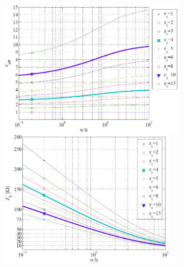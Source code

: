 \includegraphics[height=7cm]{./bilder/components_filter_microstrip_er.png}		
\includegraphics[height=7cm]{./bilder/components_filter_microstrip_ZL.png} \\

